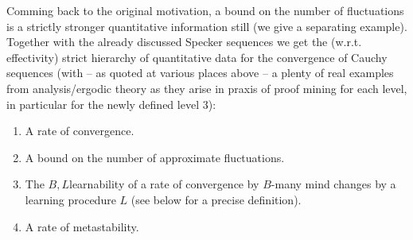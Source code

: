 Comming back to the original motivation, a bound on the number of fluctuations is a   
strictly stronger quantitative information still (we give a separating example).
Together with the already discussed Specker sequences 
we get the (w.r.t. effectivity) strict hierarchy of 
quantitative data for the convergence of Cauchy sequences 
(with -- as quoted at various places above -- a plenty of real examples from analysis/ergodic theory as
they arise in praxis of proof mining for each level, in particular for the newly defined level 3):
\begin{enumerate}
\item 
A rate of convergence.
\item 
A bound on the number of approximate fluctuations.
\item 
The $B,L$\nbd learnability of a rate of convergence by 
$B$-many mind changes by a learning procedure $L$ (see below for a precise definition). 
\item 
A rate of metastability.
\end{enumerate}   
